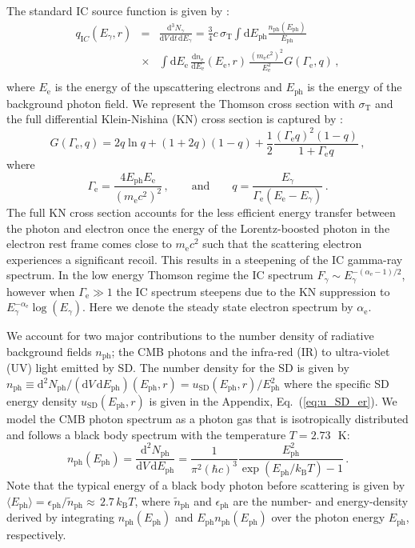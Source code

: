 \documentclass[10pt,aps,pra,reprint,amsmath,amsfonts,amssymb,showpacs,nofootinbib,floatfix]{revtex4-1}
\newcommand{\rmn}{\mathrm}
\newcommand{\ph}{\rmn{ph}}
\newcommand{\eph}{E_\ph}
\newcommand{\sd}{\rmn{SD}}
\newcommand{\ee}{E_\rmn{e}}
\newcommand{\B}{\rmn{B}}
\newcommand{\dd}{\rmn{d}}
\newcommand{\e}{\rmn{e}}
\newcommand{\eg}{E_\gamma}
\begin{document}
The standard IC source function is given by
\cite{1979rpa..book.....R}:
\begin{eqnarray}
  q_{\rmn IC}(\eg, r) &=& \frac{\dd^3 N_\gamma}{\dd V\,\dd t\,\dd \eg} =
 \frac{3}{4}c\,\sigma_\rmn{T}
\int\dd \eph \frac{n_\rmn{ph}(\eph)}{\eph}\nonumber\\
&\times& \int \dd \ee\,\frac{\dd n_\e}{\dd \ee}(\ee,r)\,
 \frac{\left(m_\e c^2\right)^2}{\ee^2}G(\Gamma_\e,q)\,,\nonumber\\
  \label{eq:ICemiss}
\end{eqnarray}
where $\ee$ is the energy of the upscattering electrons and $\eph$ is
the energy of the background photon field. We represent the Thomson
cross section with $\sigma_\rmn{T}$ and the full differential
Klein-Nishina (KN) cross section is captured by
\cite{1970RvMP...42..237B}:
\begin{equation}
\label{eq:KN_spec}
G(\Gamma_\e,q) = 2q\ln{q}+(1+2q)(1-q)+
\frac{1}{2}\frac{\left(\Gamma_\e q\right)^2\left(1-q\right)}
     {1+\Gamma_\e q}\,,
\end{equation}
where
\begin{equation}
\Gamma_\e=\frac{4\eph \ee}{\left(m_\e c^2\right)^2}\,,\qquad \rmn{and} \qquad
q=\frac{\eg}{\Gamma_\e\left(\ee-\eg\right)}\,.
\end{equation}
The full KN cross section accounts for the less efficient energy
transfer between the photon and electron once the energy of the
Lorentz-boosted photon in the electron rest frame comes close to $m_\e
c^2$ such that the scattering electron experiences a significant
recoil. This results in a steepening of the IC gamma-ray spectrum. In
the low energy Thomson regime the IC spectrum $F_\gamma\sim
E_\gamma^{-(\alpha_\e-1)/2}$, however when $\Gamma_\e \gg 1$ the IC
spectrum steepens due to the KN suppression to
$\eg^{-\alpha_\e}\log(\eg)$. Here we denote the steady state electron
spectrum by $\alpha_\e$.

We account for two major contributions to the number density of
radiative background fields $n_\ph$; the CMB photons and the infra-red
(IR) to ultra-violet (UV) light emitted by SD. The number density for
the SD is given by $n_\ph\equiv\dd^2 N_\ph/ (\dd V \,\dd \eph)
(\eph,r)= u_\sd(\eph,r) /\eph^2$ where the specific SD energy
density $u_\sd(\eph,r)$ is given in the Appendix,
Eq.~(\ref{eq:u_SD_er}). We model the CMB photon spectrum as a photon
gas that is isotropically distributed and follows a black body
spectrum with the temperature $T=2.73\,$~K:
\begin{equation}
\label{eq:photon_gas}
  n_\rmn{ph}(\eph) = \frac{\dd^2 N_\ph}{\dd V \,\dd \eph} =
  \frac{1}{\pi^2(\hbar c)^3}\frac{\eph^2}{\exp(\eph/k_\B T)-1}\,.
\end{equation}
Note that the typical energy of a black body photon before scattering
is given by $\langle\eph\rangle=\epsilon_\ph/\tilde{n}_\ph\approx\,2.7\, k_\B T$,
where $\tilde{n}_\ph$ and $\epsilon_\ph$ are the number- and
energy-density derived by integrating $n_\ph(\eph)$ and $\eph
n_\ph(\eph)$ over the photon energy $\eph$, respectively.
\end{document}
